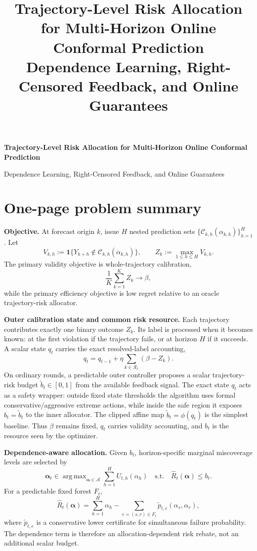 \documentclass[11pt]{article}
\title{Trajectory-Level Risk Allocation for Multi-Horizon Online Conformal Prediction\\\large Dependence Learning, Right-Censored Feedback, and Online Guarantees}
\author{}
\date{}
\DeclareMathOperator*{\argmax}{arg\,max}
\begin{document}
\begin{center}
{\Large\bfseries Trajectory-Level Risk Allocation for Multi-Horizon Online Conformal Prediction}\par
\vspace{2pt}
{\normalsize Dependence Learning, Right-Censored Feedback, and Online Guarantees}
\end{center}
\vspace{-0.5em}

\section*{One-page problem summary}
\footnotesize
\noindent
\textbf{Objective.}
At forecast origin $k$, issue $H$ nested prediction sets
$\{\mathcal C_{k,h}(\alpha_{k,h})\}_{h=1}^H$.  Let
\[
    V_{k,h}
    :=
    \mathbf 1\{Y_{k+h}\notin\mathcal C_{k,h}(\alpha_{k,h})\},
    \qquad
    Z_k:=\max_{1\le h\le H}V_{k,h}.
\]
The primary validity objective is whole-trajectory calibration,
\[
    \frac1K\sum_{k=1}^K Z_k\longrightarrow\beta,
\]
while the primary efficiency objective is low regret relative to an
oracle trajectory-risk allocator.

\smallskip
\noindent
\textbf{Outer calibration state and common risk resource.}
Each trajectory contributes exactly one binary outcome $Z_k$.  Its label is
processed when it becomes known: at the first violation if the trajectory
fails, or at horizon $H$ if it succeeds.  A scalar state $q_t$ carries the
exact resolved-label accounting,
\[
    q_t
    =
    q_{t-1}
    +
    \eta\sum_{k\in\mathcal R_t}(\beta-Z_k).
\]
On ordinary rounds, a predictable outer controller proposes a scalar
trajectory-risk budget $\widetilde b_t\in[0,1]$ from the available feedback
signal.  The exact state $q_t$ acts as a safety wrapper: outside fixed state
thresholds the algorithm uses formal conservative/aggressive extreme actions,
while inside the safe region it exposes $b_t=\widetilde b_t$ to the inner
allocator.  The clipped affine map $\widetilde b_t=\phi(q_t)$ is the simplest
baseline.  Thus $\beta$ remains fixed, $q_t$ carries validity accounting, and
$b_t$ is the resource seen by the optimizer.

\smallskip
\noindent
\textbf{Dependence-aware allocation.}
Given $b_t$, horizon-specific marginal miscoverage levels are selected by
\[
\boxed{
\bm\alpha_t\in\argmax_{\bm\alpha\in\mathcal A}
\sum_{h=1}^H U_{t,h}(\alpha_h)
\quad\text{s.t.}\quad
\widehat R_t(\bm\alpha)\le b_t .}
\]
For a predictable fixed forest $F_t$,
\[
    \widehat R_t(\bm\alpha)
    =
    \sum_{h=1}^H\alpha_h
    -
    \sum_{e=(s,r)\in F_t}
    \widetilde p_{t,e}(\alpha_s,\alpha_r),
\]
where $\widetilde p_{t,e}$ is a conservative lower certificate for simultaneous
failure probability.  The dependence term is therefore an
allocation-dependent risk rebate, not an additional scalar budget.
\end{document}
